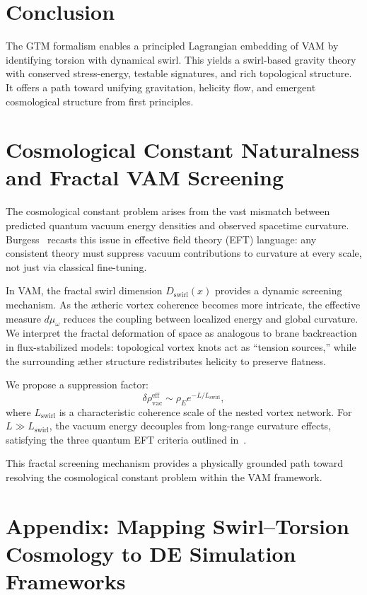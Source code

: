 \documentclass[11pt]{article}
\begin{document}
        \section{Conclusion}

        The GTM formalism enables a principled Lagrangian embedding of VAM by identifying torsion with dynamical swirl. This yields a swirl-based gravity theory with conserved stress-energy, testable signatures, and rich topological structure. It offers a path toward unifying gravitation, helicity flow, and emergent cosmological structure from first principles.

    \appendix
    \section{Cosmological Constant Naturalness and Fractal VAM Screening}

    The cosmological constant problem arises from the vast mismatch between predicted quantum vacuum energy densities and observed spacetime curvature. Burgess~\cite{burgessCCProblem} recasts this issue in effective field theory (EFT) language: any consistent theory must suppress vacuum contributions to curvature at every scale, not just via classical fine-tuning.

    In VAM, the fractal swirl dimension \( D_\text{swirl}(x) \) provides a dynamic screening mechanism. As the ætheric vortex coherence becomes more intricate, the effective measure \( d\mu_\omega \) reduces the coupling between localized energy and global curvature. We interpret the fractal deformation of space as analogous to brane backreaction in flux-stabilized models: topological vortex knots act as ``tension sources,'' while the surrounding æther structure redistributes helicity to preserve flatness.

    We propose a suppression factor:
    \[
        \delta \rho_\text{vac}^{\text{eff}} \sim \rho_{\scriptscriptstyle\boldsymbol\!E}e^{-L / L_\text{swirl}},
    \]
    where \( L_\text{swirl} \) is a characteristic coherence scale of the nested vortex network. For \( L \gg L_\text{swirl} \), the vacuum energy decouples from long-range curvature effects, satisfying the three quantum EFT criteria outlined in~\cite{burgessCCProblem}.

    This fractal screening mechanism provides a physically grounded path toward resolving the cosmological constant problem within the VAM framework.

    \appendix
    \section*{Appendix: Mapping Swirl–Torsion Cosmology to DE Simulation Frameworks}
\end{document}
